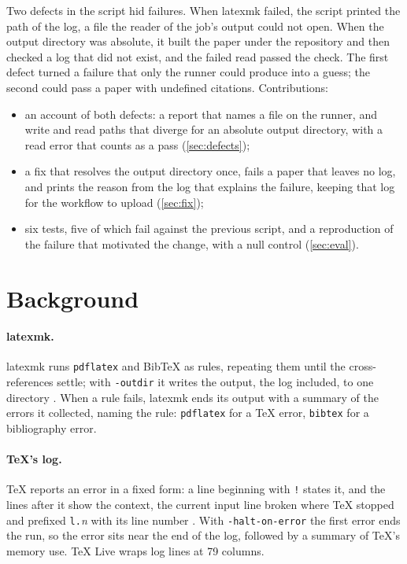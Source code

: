 \documentclass[11pt]{article}
\theoremstyle{plain}
\theoremstyle{definition}
\newcommand{\code}[1]{\texttt{#1}}
\begin{document}
Two defects in the script hid failures. When latexmk failed, the script printed the path of the
log, a file the reader of the job's output could not open. When the output directory was
absolute, it built the paper under the repository and then checked a log that did not exist, and
the failed read passed the check. The first defect turned a failure that only the runner could
produce into a guess; the second could pass a paper with undefined citations. Contributions:
\begin{itemize}
  \item an account of both defects: a report that names a file on the runner, and write and read
        paths that diverge for an absolute output directory, with a read error that counts as a
        pass (\cref{sec:defects});
  \item a fix that resolves the output directory once, fails a paper that leaves no log, and prints
        the reason from the log that explains the failure, keeping that log for the workflow to
        upload (\cref{sec:fix});
  \item six tests, five of which fail against the previous script, and a reproduction of the
        failure that motivated the change, with a null control (\cref{sec:eval}).
\end{itemize}

\section{Background}
\paragraph{latexmk.} latexmk runs \code{pdflatex} and BibTeX as rules, repeating them until the
cross-references settle; with \code{-outdir} it writes the output, the log included, to one
directory \cite{collins2026latexmk}. When a rule fails, latexmk ends its output with a summary of
the errors it collected, naming the rule: \code{pdflatex} for a TeX error, \code{bibtex} for a
bibliography error.

\paragraph{TeX's log.} TeX reports an error in a fixed form: a line beginning with \code{!} states
it, and the lines after it show the context, the current input line broken where TeX stopped and
prefixed \code{l.}\textit{n} with its line number \cite{knuth1984texbook}. With
\code{-halt-on-error} the first error ends the run, so the error sits near the end of the log,
followed by a summary of TeX's memory use. TeX Live wraps log lines at 79 columns.
\end{document}

